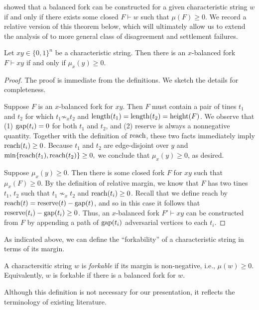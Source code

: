 \citet{KRDO17} showed that a balanced fork can be constructed for a
given characteristic string $w$ if and only if there exists some
closed $F\vdash w$ such that $\mu(F)\geq 0$.  We record a relative
version of this theorem below, which will ultimately allow us to
extend the analysis of \cite{KRDO17} to more general class of
disagreement and settlement failures.

\begin{fact}\label{fact:margin-balance}
  Let $xy \in \{0,1\}^n$ be a characteristic string. Then there is an
  $x$-balanced fork $F \vdash xy$ if and only if $\mu_x(y) \geq 0$.
\end{fact}

\begin{proof}
  The proof is immediate from the definitions. We sketch the details for completeness.
  
  Suppose $F$ is an $x$-balanced fork for $xy$. Then $F$ must contain a pair of tines $t_1$ and $t_2$ for which
  $t_1 \not\sim_x t_2$ and $\operatorname{length}(t_1) = \operatorname{length}(t_2) = \operatorname{height}(F)$. We observe that (1) $\operatorname{gap}(t_i)=0$ for both $t_1$ and $t_2$, and (2) reserve is always a nonnegative quantity. Together with the definition of $\operatorname{reach}$, these two facts immediately imply $\operatorname{reach}(t_i) \geq 0$. Because $t_1$ and $t_2$ are edge-disjoint over $y$ and $\min\{\operatorname{reach}(t_1),\operatorname{reach}(t_2)\}\geq0,$ we conclude that $\mu_x(y)\geq 0$, as desired. 

  Suppose $\mu_x(y)\geq 0$. Then there is some closed fork $F$ for $xy$ such that $\mu_x(F)\geq0$. By the definition of
   relative margin, we know that $F$ has two tines $t_1$, $t_2$ such that $t_1\nsim_x t_2$ and 
  $\operatorname{reach}(t_i)\geq0$. Recall that we define reach by $\operatorname{reach}(t)=\operatorname{reserve}(t)-\operatorname{gap}(t)$, and so in this case 
 it follows that $\operatorname{reserve}(t_i) - \operatorname{gap}(t_i)\geq0$. Thus, an $x$-balanced fork $F'\vdash xy$ can be constructed from $F$ by 
 appending a path of $\operatorname{gap}(t_i)$ adversarial vertices to each $t_i$.
\end{proof}

As indicated above, we can define the ``forkability'' of a
characteristic string in terms of its margin.
\begin{definition}\label{def:forkable}
  A charactersitic string $w$ is \emph{forkable} if its margin is non-negative, i.e., $\mu(w) \geq 0$.
  Equivalently, $w$ is forkable if there is a balanced fork for $w$.
\end{definition}
Although this definition is not necessary for our presentation, it
reflects the terminology of existing literature.

